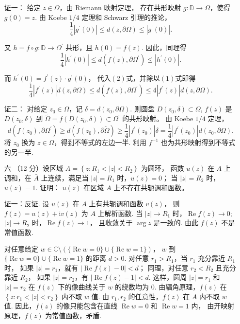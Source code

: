 \begin{enumerate}
证一：
给定 $z \in \Omega$，由 Riemann 映射定理，
存在共形映射 $g: \mathbb{D} \rightarrow \Omega$，使得 $g(0)=z$. 
由 Koebe $1 / 4$ 定理和 Schwarz 引理的推论，
$$\frac{1}{4}\left|g^{\prime}(0)\right| \leq d(z, \partial \Omega) 
\leq\left|g^{\prime}(0)\right|. \tag{1}$$

又 $h=f \circ g: \mathbb{D} \rightarrow \Omega^{\prime}$ 共形，且 $h(0)=f(z)$. 因此，同理得
$$\frac{1}{4}\left|h^{\prime}(0)\right| 
\leq d(f(z), \partial \Omega^{\prime}) 
\leq\left|h^{\prime}(0)\right|. \tag{2}$$

而 $h^{\prime}(0)=f^{\prime}(z) \cdot g^{\prime}(0)$，
代入$(2)$式，并除以$(1)$式即得
$$\frac{1}{4}\left|f^{\prime}(z)\right| d(z, \partial \Omega) 
\leq d(f(z), \partial \Omega^{\prime}) 
\leq 4\left|f^{\prime}(z)\right| d(z, \partial \Omega).$$

证二：
对给定 $z_{0} \in \Omega$，记 $\delta=d(z_0, \partial \Omega)$.
则圆盘 $D(z_{0}, \delta) \subset \Omega$, 
$f(z)$ 是 $D(z_{0}, \delta)$ 到 $\tilde{\Omega}=f(D(z_{0}, \delta)) \subset \Omega^{\prime}$ 的共形映射。
由 Koebe $1/4$ 定理，
$$d(f(z_{0}), \partial \Omega^{\prime}) 
\geq d(f(z_{0}), \partial \tilde{\Omega}) 
\geq \frac{1}{4}\left|f^{\prime}(z_{0})\right| \delta
=\frac{1}{4}\left|f^{\prime}(z_{0})\right| d(z_{0}, \partial \Omega).$$
将 $z_{0}$ 换为 $z \in \Omega$，得到不等式的左边一半.
利用 $f^{-1}$ 也为共形映射得到不等式的另一半.

\item[六]（12 分）设区域 $A=\left\{z: R_{1}<|z|<R_{2}\right\}$ 为圆环，
函数 $u(z)$ 在 $A$ 上调和，在 $\bar{A}$ 上连续，满足当 $|z|=R_{1}$ 时，$u(z)=0$；
当 $|z|=R_{2}$ 时，$u(z)=1$. 证明： $u(z)$ 在区域 $A$ 上不存在共轭调和函数。

证一：反证. 设 $u(z)$ 在 $A$ 上有共轭调和函数 $v(z)$，
则 $f(z)=u(z)+\mathrm{i} v(z)$ 为 $A$ 上解析函数. 
当 $|z| \rightarrow R_{1}$ 时，$\operatorname{Re} f(z) \rightarrow 0$; 
$|z| \rightarrow R_{2}$ 时，$\operatorname{Re} f(z) \rightarrow 1$，
且收敛关于 $\arg z$ 是一致的. 由此 $f(z)$ 不是常值函数.

对任意给定 $w \in \mathbb{C} \setminus (\{\operatorname{Re} w=0\} \cup\{\operatorname{Re} w=1\})$，
$w$ 到 $\{\operatorname{Re} w=0\} \cup\{\operatorname{Re} w=1\}$ 的距离 $d>0$.
对任意 $r_{1}>R_{1}$，当 $r_{1}$ 充分靠近 $R_{1}$ 时，
如果 $|z|=r_{1}$，就有 $|\operatorname{Re} f(z)-0|<d$；
同理，对任意 $r_{2}<R_{2}$ 且充分靠近 $R_{2}$，
如果 $|z|=r_{2}$，有 $|\operatorname{Re} f(z)-1|<d$.
这样，圆周 $|z|=r_{1}$ 和 $|z|=r_{2}$ 在 $f(z)$ 下的像曲线关于 $w$ 的绕数均为 $0$.
由辐角原理，$f(z)$ 在 $\left\{z: r_{1}<|z|<r_{2}\right\}$ 内不取 $w$ 值.
由 $r_{1}, r_{2}$ 的任意性，$f(z)$ 在 $A$ 内不取 $w$ 值.
因此，$f(z)$ 的像只能包含在直线 $\operatorname{Re} w=0$ 和 $\operatorname{Re} w=1$ 内，
由开映射原理，$f(z)$ 为常值函数，矛盾.


\end{enumerate}
